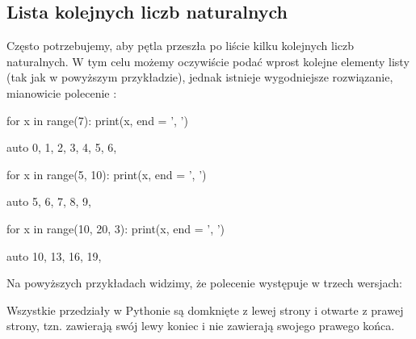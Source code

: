 \subsection{Lista kolejnych liczb naturalnych}
Często potrzebujemy, aby pętla przeszła po liście kilku kolejnych liczb naturalnych.
W tym celu możemy oczywiście podać wprost kolejne elementy listy (tak jak w powyższym przykładzie),
jednak istnieje wygodniejsze rozwiązanie, mianowicie polecenie :

\begin{CodeFrame}[python]{0.5\textwidth}
for x in range(7):
    print(x, end = ', ')
\end{CodeFrame}
\begin{CodeFrame}{auto}
0, 1, 2, 3, 4, 5, 6, 
\end{CodeFrame}

\begin{CodeFrame}[python]{0.5\textwidth}
for x in range(5, 10):
    print(x, end = ', ')
\end{CodeFrame}
\begin{CodeFrame}{auto}
5, 6, 7, 8, 9, 
\end{CodeFrame}

\begin{CodeFrame}[python]{0.5\textwidth}
for x in range(10, 20, 3):
    print(x, end = ', ')
\end{CodeFrame}
\begin{CodeFrame}{auto}
10, 13, 16, 19, 
\end{CodeFrame}

\noindent Na powyższych przykładach widzimy, że polecenie  występuje w trzech wersjach:

\begin{ProTip}{}
\normalsize Wszystkie przedziały w Pythonie są domknięte z lewej strony i otwarte z prawej strony,
tzn. zawierają swój lewy koniec i nie zawierają swojego prawego końca.
\end{ProTip}

